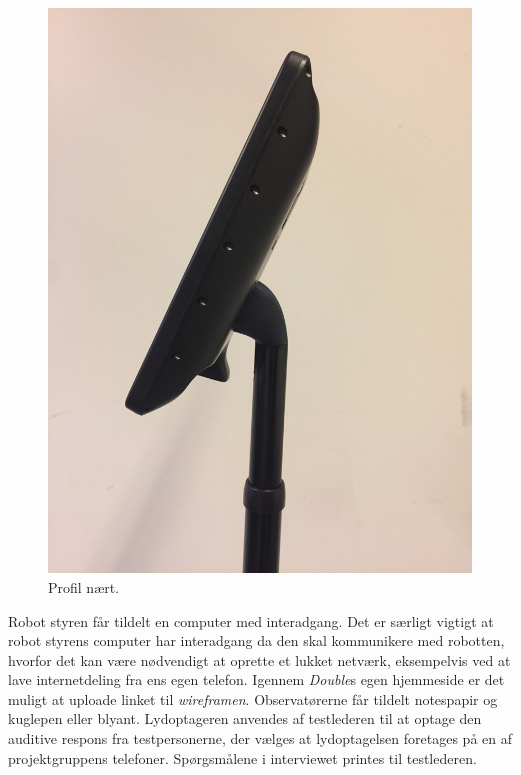 \begin{figure}[H]
\begin{minipage}{.33\textwidth}
  \includegraphics[width=\linewidth, angle =-90]{Figure/ModificeretDoubleSideClose}
  \caption{Profil nært.}
  \label{fig:ModificeretDoubleSideClose}
\end{minipage}
\end{figure}
\noindent
%
Robot styren får tildelt en computer med interadgang. Det er særligt vigtigt at robot styrens computer har interadgang da den skal kommunikere med robotten, hvorfor det kan være nødvendigt at oprette et lukket netværk, eksempelvis ved at lave internetdeling fra ens egen telefon. Igennem \textit{Double}s egen hjemmeside er det muligt at uploade linket til \textit{wireframen}. Observatørerne får tildelt notespapir og kuglepen eller blyant. Lydoptageren anvendes af testlederen til at optage den auditive respons fra testpersonerne, der vælges at lydoptagelsen foretages på en af projektgruppens telefoner. Spørgsmålene i interviewet printes til testlederen.
%

